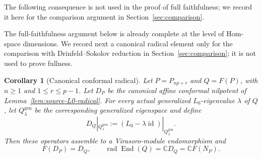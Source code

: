 \documentclass[12pt,leqno]{amsart}
\numberwithin{equation}{section}
\newtheorem{cor}[thm]{Corollary}
\newcommand{\End}{\operatorname{End}}
\newcommand{\rad}{\operatorname{rad}}
\newcommand{\id}{\operatorname{id}}
\def\C{\mathbb{C}}
\begin{document}
The following consequence is not used in the proof of full faithfulness;
we record it here for the comparison argument in Section~\ref{sec:comparison}.

The full-faithfulness argument below is already complete at the level of
Hom-space dimensions.  We record next a canonical radical element only
for the comparison with Drinfeld--Sokolov reduction in
Section~\ref{sec:comparison}; it is not used to prove fullness.

\begin{cor}[Canonical conformal radical]\label{cor:target-conformal-radical}
Let $P=P_{np+r}$ and $Q=F(P)$, with $n\ge1$ and $1\le r\le p-1$.
Let $D_P$ be the canonical affine conformal nilpotent of
Lemma~\ref{lem:source-L0-radical}.  For every actual generalized
$L_0$-eigenvalue $\lambda$ of $Q$, let $Q^{\mathrm{gen}}_\lambda$ be the
corresponding generalized eigenspace and define
\[
 D_Q|_{Q^{\mathrm{gen}}_\lambda}
 :=(L_0-\lambda\id)|_{Q^{\mathrm{gen}}_\lambda}.
\]
Then these operators assemble to a Virasoro-module endomorphism and
\begin{equation}\label{eq:canonical-radical-matching}
 F(D_P)=D_Q,
 \qquad
 \rad\End(Q)=\C D_Q=\C F(N_P).
\end{equation}
\end{cor}
\end{document}
